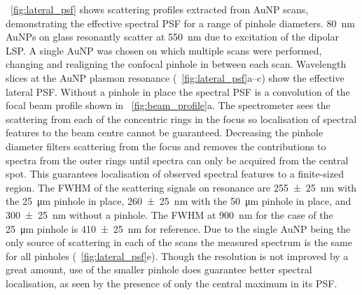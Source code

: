 \documentclass{article}
\begin{document}
\figurename~\ref{fig:lateral_psf} shows scattering profiles extracted from AuNP scans, demonstrating the effective spectral PSF for a range of pinhole diameters. \SI{80}{nm} AuNPs on glass resonantly scatter at \SI{550}{nm} due to excitation of the dipolar LSP. A single AuNP was chosen on which multiple scans were performed, changing and realigning the confocal pinhole in between each scan. Wavelength slices at the AuNP plasmon resonance (\figurename~\ref{fig:lateral_psf}a--c) show the effective lateral PSF. Without a pinhole in place the spectral PSF is a convolution of the focal beam profile shown in \figurename~\ref{fig:beam_profile}a. The spectrometer sees the scattering from each of the concentric rings in the focus so localisation of spectral features to the beam centre cannot be guaranteed. Decreasing the pinhole diameter filters scattering from the focus and removes the contributions to spectra from the outer rings until spectra can only be acquired from the central spot. This guarantees localisation of observed spectral features to a finite-sized region. The FWHM of the scattering signals on resonance are \SI{255\pm25}{nm} with the \SI{25}{\micro\metre} pinhole in place, \SI{260\pm25}{nm} with the \SI{50}{\micro\metre} pinhole in place, and \SI{300\pm25}{nm} without a pinhole.
The FWHM at \SI{900}{nm} for the case of the \SI{25}{\micro\metre} pinhole is \SI{410\pm25}{nm} for reference. Due to the single AuNP being the only source of scattering in each of the scans the measured spectrum is the same for all pinholes (\figurename~\ref{fig:lateral_psf}e). Though the resolution is not improved by a great amount, use of the smaller pinhole does guarantee better spectral localisation, as seen by the presence of only the central maximum in its PSF.
\end{document}
